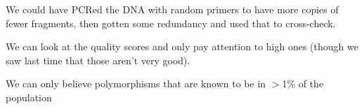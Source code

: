 
We could have PCRed the DNA with random primers to have more copies of
fewer fragments, then gotten some redundancy and used that to
cross-check.

We can look at the quality scores and only pay attention to high ones
(though we saw last time that those aren't very good).

We can only believe polymorphisms that are known to be in $>$1\% of the population
